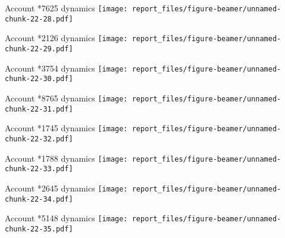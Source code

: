 \documentclass[ignorenonframetext,]{beamer}
\begin{document}
\begin{frame}{Account *7625 dynamics
\texttt{[image: report\_files/figure-beamer/unnamed-chunk-22-28.pdf]}}
\protect\hypertarget{account-7625-dynamics-1}{}

\end{frame}

\begin{frame}{Account *2126 dynamics
\texttt{[image: report\_files/figure-beamer/unnamed-chunk-22-29.pdf]}}
\protect\hypertarget{account-2126-dynamics-1}{}

\end{frame}

\begin{frame}{Account *3754 dynamics
\texttt{[image: report\_files/figure-beamer/unnamed-chunk-22-30.pdf]}}
\protect\hypertarget{account-3754-dynamics}{}

\end{frame}

\begin{frame}{Account *8765 dynamics
\texttt{[image: report\_files/figure-beamer/unnamed-chunk-22-31.pdf]}}
\protect\hypertarget{account-8765-dynamics-1}{}

\end{frame}

\begin{frame}{Account *1745 dynamics
\texttt{[image: report\_files/figure-beamer/unnamed-chunk-22-32.pdf]}}
\protect\hypertarget{account-1745-dynamics}{}

\end{frame}

\begin{frame}{Account *1788 dynamics
\texttt{[image: report\_files/figure-beamer/unnamed-chunk-22-33.pdf]}}
\protect\hypertarget{account-1788-dynamics-1}{}

\end{frame}

\begin{frame}{Account *2645 dynamics
\texttt{[image: report\_files/figure-beamer/unnamed-chunk-22-34.pdf]}}
\protect\hypertarget{account-2645-dynamics}{}

\end{frame}

\begin{frame}{Account *5148 dynamics
\texttt{[image: report\_files/figure-beamer/unnamed-chunk-22-35.pdf]}}
\protect\hypertarget{account-5148-dynamics}{}

\end{frame}
\end{document}
